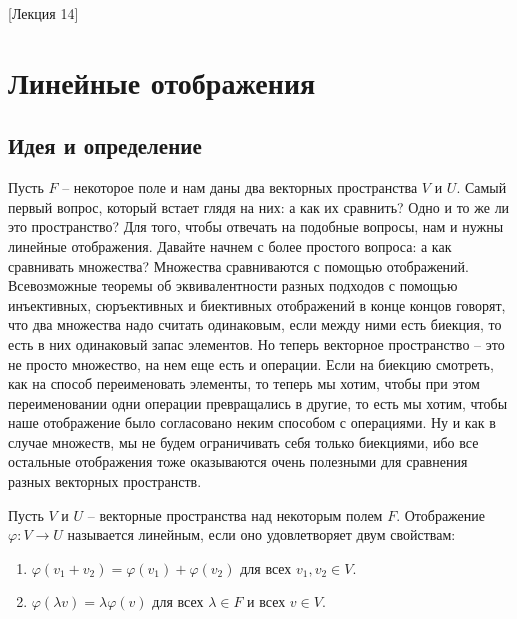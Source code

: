 [Лекция 14]


\newpage
\section{Линейные отображения}

\subsection{Идея и определение}

Пусть $F$ -- некоторое поле и нам даны два векторных пространства $V$ и $U$.
Самый первый вопрос, который встает глядя на них: а как их сравнить?
Одно и то же ли это пространство?
Для того, чтобы отвечать на подобные вопросы, нам и нужны линейные отображения.
Давайте начнем с более простого вопроса: а как сравнивать множества?
Множества сравниваются с помощью отображений.
Всевозможные теоремы об эквивалентности разных подходов с помощью инъективных, сюръективных и биективных отображений в конце концов говорят, что два множества надо считать одинаковым, если между ними есть биекция, то есть в них одинаковый запас элементов.
Но теперь векторное пространство -- это не просто множество, на нем еще есть и операции.
Если на биекцию смотреть, как на способ переименовать элементы, то теперь мы хотим, чтобы при этом переименовании одни операции превращались в другие, то есть мы хотим, чтобы наше отображение было согласовано неким способом с операциями.
Ну и как в случае множеств, мы не будем ограничивать себя только биекциями, ибо все остальные отображения тоже оказываются очень полезными для сравнения разных векторных пространств.

\begin{definition}
Пусть $V$ и $U$ -- векторные пространства над некоторым полем $F$.
Отображение $\varphi\colon V\to U$ называется линейным, если оно удовлетворяет двум свойствам:
\begin{enumerate}
\item $\varphi(v_1 + v_2) = \varphi(v_1) + \varphi(v_2)$ для всех $v_1,v_2\in V$.
\item $\varphi(\lambda v) = \lambda \varphi(v)$ для всех $\lambda \in F$ и всех $v\in V$.
\end{enumerate}
\end{definition}

